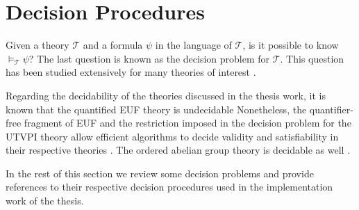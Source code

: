\section{Decision Procedures} \label{decision_procedures}

Given a theory $\mathcal{T}$ and a formula $\psi$ in 
the language of $\mathcal{T}$, is it possible to know 
$\models_{\mathcal{T}} \psi$? The last question is 
known as the decision problem for 
$\mathcal{T}$. This question has 
been studied extensively for many theories of interest 
\cite{borger2001classical}. 

Regarding the decidability of the theories 
discussed in the thesis work, it is known that 
the quantified EUF theory is undecidable \cite{borger2001classical}
Nonetheless, the quantifier-free fragment of EUF and 
the restriction imposed in the decision problem for 
the UTVPI theory allow efficient algorithms to decide 
validity and satisfiability in their respective theories 
\cite{10.1145/322186.322198, 10.1145/322217.322228, 
10.1007/11559306_9}. The ordered abelian group theory
is decidable as well \cite{DBLP:books/daglib/0076838}.

In the rest of this section we review some decision 
problems and provide references to their respective
decision procedures used in the implementation work of 
the thesis.






